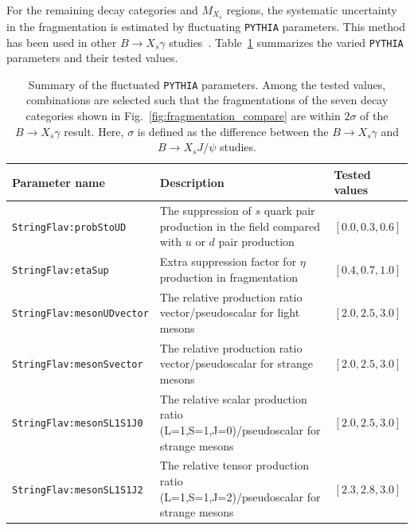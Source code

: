 For the remaining decay categories and $M_{X_{s}}$ regions, the systematic uncertainty in the fragmentation is estimated by fluctuating \texttt{PYTHIA} parameters.
This method has been used in other $B \rightarrow X_{s} \gamma$ studies~\cite{Belle:2018iff,Belle:2014nmp}.
Table~\ref{tab:Pythia_fluctuation} summarizes the varied \texttt{PYTHIA} parameters and their tested values.
\begin{table}
\caption{
        Summary of the fluctuated \texttt{PYTHIA} parameters.
        Among the tested values, combinations are selected such that the fragmentations of the seven decay categories shown in Fig.~\ref{fig:fragmentation_compare} are within $2\sigma$ of the $B\rightarrow X_s\gamma$ result.
        Here, $\sigma$ is defined as the difference between the
        $B \rightarrow X_s\gamma$ and $B\rightarrow X_s J/\psi$ studies.
    }
    \renewcommand{\arraystretch}{1.4}
    \setlength{\tabcolsep}{4pt}
    \centering
    \small

    \begin{tabularx}{\textwidth}{
        >{\raggedright\arraybackslash}p{5.0cm}
        >{\raggedright\arraybackslash}X
        >{\centering\arraybackslash}p{2.6cm}
    }
        \hline
        \hline
        Parameter name & Description & Tested values \\
        \hline

        \mbox{\texttt{StringFlav:probStoUD}}
        &
        The suppression of $s$ quark pair production in the field compared with $u$ or $d$ pair production
        &
        $[0.0, 0.3, 0.6]$ \\

        \mbox{\texttt{StringFlav:etaSup}}
        &
        Extra suppression factor for $\eta$ production \newline in fragmentation
        &
        $[0.4, 0.7, 1.0]$ \\

        \mbox{\texttt{StringFlav:mesonUDvector}}
        &
        The relative production ratio vector/pseudoscalar for light mesons
        &
        $[2.0, 2.5, 3.0]$ \\

        \mbox{\texttt{StringFlav:mesonSvector}}
        &
        The relative production ratio vector/pseudoscalar for strange mesons
        &
        $[2.0, 2.5, 3.0]$ \\

        \mbox{\texttt{StringFlav:mesonSL1S1J0}}
        &
        The relative scalar production ratio \newline (L=1,S=1,J=0)/pseudoscalar for strange mesons
        &
        $[2.0, 2.5, 3.0]$ \\

        \mbox{\texttt{StringFlav:mesonSL1S1J2}}
        &
        The relative tensor production ratio \newline (L=1,S=1,J=2)/pseudoscalar for strange mesons
        &
        $[2.3, 2.8, 3.0]$ \\

        \hline
        \hline
    \end{tabularx}

    \label{tab:Pythia_fluctuation}
\end{table}
